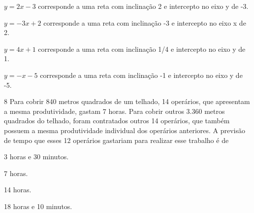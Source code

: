 \begin{escolha}
\item $y = 2x - 3$ corresponde a uma reta com inclinação 2 e intercepto no
eixo y de -3.
\item $y = -3x + 2$ corresponde a uma reta com inclinação -3 e intercepto no
eixo x de 2.
\item $y = 4x + 1$ corresponde a uma reta com inclinação 1/4 e intercepto no
eixo y de 1.
\item $y = -x - 5$ corresponde a uma reta com inclinação -1 e intercepto no
eixo y de -5.
\end{escolha}







\pagebreak

\num{8} Para cobrir 840 metros quadrados de um telhado, 14 operários, que apresentam a
mesma produtividade, gastam 7 horas. Para cobrir outros 3.360 metros quadrados do
telhado, foram contratados outros 14 operários, que também possuem a
mesma produtividade individual dos operários anteriores. A previsão de
tempo que esses 12 operários gastariam para realizar esse trabalho é de

\begin{escolha}
\item 3 horas e 30 minutos.
\item 7 horas.
\item 14 horas.
\item 18 horas e 10 minutos.
\end{escolha}

